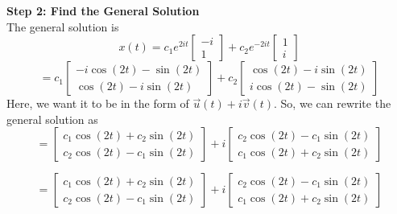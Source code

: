 {    \textbf{Step 2: Find the General Solution} \\
    The general solution is
    \[
        x(t) = c_1e^{2it}\begin{bmatrix} -i \\ 1 \end{bmatrix} + c_2e^{-2it}\begin{bmatrix} 1 \\ i \end{bmatrix}
    \]
    \[
        = c_1\begin{bmatrix} -i\cos(2t) - \sin(2t) \\ \cos(2t) - i\sin(2t) \end{bmatrix} + c_2\begin{bmatrix} \cos(2t) - i\sin(2t) \\ i\cos(2t) - \sin(2t) \end{bmatrix}
    \]
    Here, we want it to be in the form of $\vec{u}(t) + i \vec{v}(t)$. So, we can rewrite the general solution as \\
    \[
        = \begin{bmatrix} c_1\cos(2t) + c_2\sin(2t) \\ c_2\cos(2t) - c_1\sin(2t) \end{bmatrix} + i\begin{bmatrix} c_2\cos(2t) - c_1\sin(2t) \\ c_1\cos(2t) + c_2\sin(2t) \end{bmatrix}
    \]
    
    \[
        = \begin{bmatrix} c_1\cos(2t) + c_2\sin(2t) \\ c_2\cos(2t) - c_1\sin(2t) \end{bmatrix} + i\begin{bmatrix} c_2\cos(2t) - c_1\sin(2t) \\ c_1\cos(2t) + c_2\sin(2t) \end{bmatrix}
    \]



    
}








\newpage

